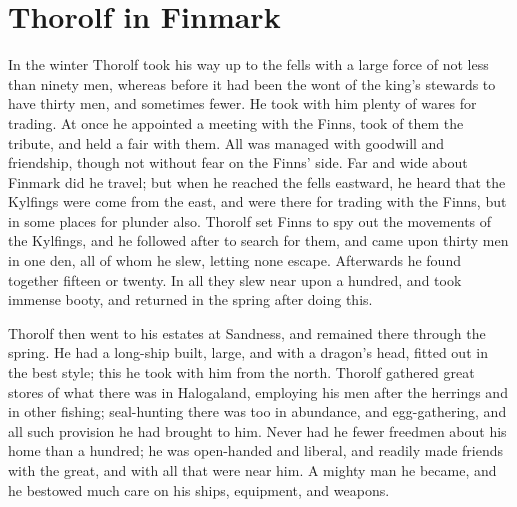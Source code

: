\chapter{Thorolf in Finmark}
In the winter Thorolf took his way up to the fells with a large force of not less than ninety men, whereas before it had been the wont of the king's stewards to have thirty men, and sometimes fewer. He took with him plenty of wares for trading. At once he appointed a meeting with the Finns, took of them the tribute, and held a fair with them. All was managed with goodwill and friendship, though not without fear on the Finns' side. Far and wide about Finmark did he travel; but when he reached the fells eastward, he heard that the Kylfings were come from the east, and were there for trading with the Finns, but in some places for plunder also. Thorolf set Finns to spy out the movements of the Kylfings, and he followed after to search for them, and came upon thirty men in one den, all of whom he slew, letting none escape. Afterwards he found together fifteen or twenty. In all they slew near upon a hundred, and took immense booty, and returned in the spring after doing this.

Thorolf then went to his estates at Sandness, and remained there through the spring. He had a long-ship built, large, and with a dragon's head, fitted out in the best style; this he took with him from the north. Thorolf gathered great stores of what there was in Halogaland, employing his men after the herrings and in other fishing; seal-hunting there was too in abundance, and egg-gathering, and all such provision he had brought to him. Never had he fewer freedmen about his home than a hundred; he was open-handed and liberal, and readily made friends with the great, and with all that were near him. A mighty man he became, and he bestowed much care on his ships, equipment, and weapons.

